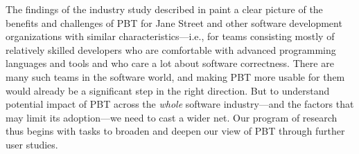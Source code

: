 




The findings of the industry study described in  paint a clear
picture of the benefits and challenges of PBT for
Jane Street and other software development organizations with similar
characteristics---i.e., for teams consisting mostly
of relatively skilled developers who are comfortable with
advanced programming languages and tools and who care a lot about
software correctness.  There are many such teams in the software
world, and making PBT more
usable for them would already be a significant step in the
right direction.  But to
understand potential impact of PBT
across the {\em  whole} software
industry---and the factors that may limit its adoption---we need to
cast a wider net.
%
Our program of research thus begins with tasks to broaden and deepen
our view of PBT through further user studies.

